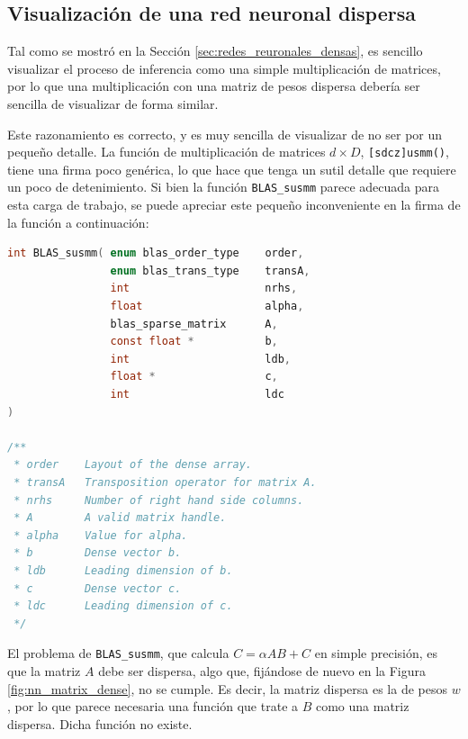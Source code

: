 \subsection{Visualización de una red neuronal dispersa}
\label{ssec:visualizacion_nn_dispersa}
Tal como se mostró en la Sección \ref{sec:redes_reuronales_densas}, es sencillo visualizar el proceso de inferencia como una simple multiplicación de matrices, por lo que una multiplicación con una matriz de pesos dispersa debería ser sencilla de visualizar de forma similar.

Este razonamiento es correcto, y es muy sencilla de visualizar de no ser por un pequeño detalle. La función de multiplicación de matrices $d\times D$, \texttt{[sdcz]usmm()}, tiene una firma poco genérica, lo que hace que tenga un sutil detalle que requiere un poco de detenimiento. Si bien la función \texttt{BLAS\_susmm} parece adecuada para esta carga de trabajo, se puede apreciar este pequeño inconveniente en la firma de la función a continuación:

\begin{lstlisting}[language=C]
int BLAS_susmm( enum blas_order_type    order,
                enum blas_trans_type    transA,
                int                     nrhs,
                float                   alpha,
                blas_sparse_matrix      A,
                const float *           b,
                int                     ldb,
                float *                 c,
                int                     ldc 
)

/**
 * order    Layout of the dense array.
 * transA   Transposition operator for matrix A.
 * nrhs     Number of right hand side columns.
 * A        A valid matrix handle.
 * alpha    Value for alpha.
 * b        Dense vector b.
 * ldb      Leading dimension of b.
 * c        Dense vector c.
 * ldc      Leading dimension of c.
 */
\end{lstlisting}

El problema de \texttt{BLAS\_susmm}, que calcula $C = \alpha AB + C$ en simple precisión, es que la matriz $A$ debe ser dispersa, algo que, fijándose de nuevo en la Figura \ref{fig:nn_matrix_dense}, no se cumple. Es decir, la matriz dispersa es la de pesos $w$, por lo que parece necesaria una función que trate a $B$ como una matriz dispersa. Dicha función no existe.

